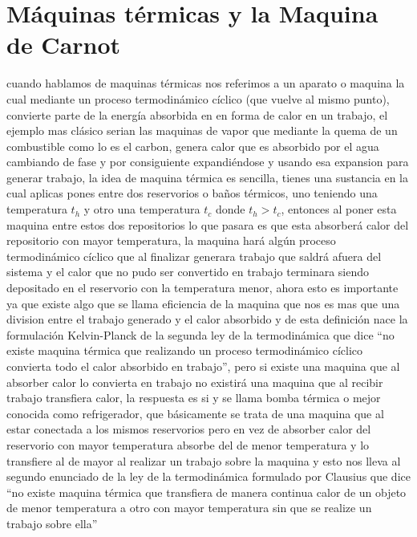 \documentclass{article}
\begin{document}
\section*{Máquinas térmicas y la Maquina de Carnot}
cuando hablamos de maquinas térmicas nos referimos a un aparato o maquina la cual mediante un proceso termodinámico cíclico (que vuelve al mismo punto), 
convierte parte de la energía absorbida en en forma de calor en un trabajo, el ejemplo mas clásico serian las maquinas de vapor que mediante la quema de un
combustible como lo es el carbon, genera calor que es absorbido por el agua cambiando de fase y por consiguiente expandiéndose y usando esa expansion para
generar trabajo, la idea de maquina térmica es sencilla, tienes una sustancia en la cual aplicas pones entre dos reservorios o baños térmicos, uno 
teniendo una temperatura $t_h$ y otro una temperatura $t_c$ donde $t_h>t_c$, entonces al poner esta maquina entre estos dos repositorios lo que pasara 
es que esta absorberá calor del repositorio con mayor temperatura, la maquina hará algún proceso termodinámico cíclico que al finalizar generara trabajo 
que saldrá afuera del sistema y el calor que no pudo ser convertido en trabajo terminara siendo depositado en el reservorio con la temperatura menor,
ahora esto es importante ya que existe algo que se llama eficiencia de la maquina que nos es mas que una division entre el trabajo generado y el calor absorbido
y de esta definición nace la formulación Kelvin-Planck de la segunda ley de la termodinámica que dice ``no existe maquina térmica que realizando un proceso
termodinámico cíclico convierta todo el calor absorbido en trabajo'', pero si existe una maquina que al absorber calor lo convierta en trabajo no existirá
una maquina que al recibir trabajo transfiera calor, la respuesta es si y se llama bomba térmica o mejor conocida como refrigerador, que básicamente se
trata de una maquina que al estar conectada a los mismos reservorios pero en vez de absorber calor del reservorio con mayor temperatura absorbe del de menor 
temperatura y lo transfiere al de mayor al realizar un trabajo sobre la maquina y esto nos lleva al segundo enunciado de la ley de la termodinámica 
formulado por Clausius que dice ``no existe maquina térmica que transfiera de manera continua calor de un objeto de menor temperatura a otro con mayor 
temperatura sin que se realize un trabajo sobre ella''
\end{document}
